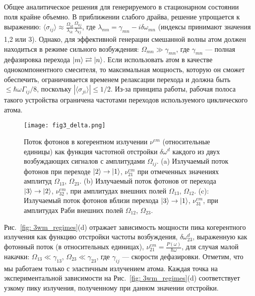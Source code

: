Общее аналитическое решения для генерируемого в стационарном состоянии поля крайне объемно. В приближении слабого драйва, решение упрощается к выражению: $\langle\sigma_{ij}\rangle\approx\frac{\Omega_{ik}}{\lambda_{ik}}\frac{\Omega_{kj}}{\lambda_{kj}}$, где $\lambda_{mn}=\gamma_{mn}-i\delta\omega_{mn}$ (индексы принимают значения 1,2 или 3). Однако, для эффективной генерации смешанной волны атом должен находиться в режиме сильного возбуждения: $\Omega_{mn}\gg\gamma_{mn}$, где $\gamma_{mn}$ --- полная дефазировка перехода $\ket{m}\rightleftarrows\ket{n}$. Если использовать атом в качестве однокомпонентного смесителя, то максимальная мощность, которую он сможет обеспечить, ограничивается временем релаксации перехода и должна быть $\leq\hbar\omega\Gamma_{ij}/8$, поскольку $|\langle\sigma_{ji}\rangle| \leq 1/2$. Из-за принципа работы, рабочая полоса такого устройства ограничена частотами переходов используемого циклического атома.
\begin{figure}[!htb]
\centering
\texttt{[image: fig3\_delta.png]} 
\caption{Поток фотонов в когерентном излучении  $\nu^{em}$ (относительные единицы) как функция частотной отстройки $\delta\omega^{d}$ какдого из двух возбуждающих сигналов с амплитудами $\Omega_{ij}$. (a) Излучаемый поток фотонов при переходе $\ket{2}\rightarrow \ket{1}$, $\nu^{em}_{21}$ при отмеченных значениях амплитуд $\Omega_{13}$, $\Omega_{23}$. (b) Излучаемый поток фотонов от перехода $\ket{3}\rightarrow \ket{2}$, $\nu^{em}_{32}$, при амплитудах внешних полей $\Omega_{13}$, $\Omega_{12}$. (c): Излучаемый поток фотонов вблизи перехода $\ket{3}\rightarrow \ket{1}$, $\nu^{em}_{31}$, при амплитудах Раби внешних полей $\Omega_{12}$, $\Omega_{23}$.}
\label{fig:exp_em}
\end{figure}

Рис.~\ref{fig: 3wm_regimes}(d) отражает зависимость мощности пика когерентного излучения как функцию отстройки частоты возбуждения, $\delta\omega_{23}^d$, выраженную как фотонный поток (в относительных единицах), 
$\nu^{em}_{21}=\frac{P(\omega)}{\hbar\omega}$, для случая малой накачки: $\Omega_{13}\ll \gamma_{13}$, $\Omega_{23}\ll\gamma_{23}$, где $\gamma_{ij}$ --- скорости дефазировки. Отметим, что мы работаем только с эластичным излучением атома. Каждая точка на экспериментальной зависимости на Рис.~\ref{fig: 3wm_regimes}(d) соответствует узкому пику излучения, полученному при данном значении отстройки.

